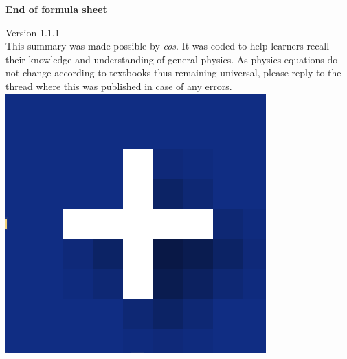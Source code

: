 \documentclass[10pt,landscape]{article}
\begin{document}
\begin{multicols*}{3}
\begin{center}
     {\textbf{End of formula sheet}} \\
\end{center}
Version 1.1.1 \\
This summary was made possible by \textit{cos}. It was coded to help learners recall their knowledge and understanding of general physics. As physics equations do not change according to textbooks thus remaining universal, please reply to the thread where this was published in case of any errors.
\includegraphics[scale=0.05]{blueicon.eps}
\end{multicols*}
\end{document}
